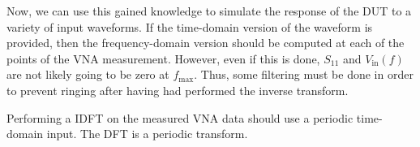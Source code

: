 \documentclass{article}
\begin{document}
Now, we can use this gained knowledge to simulate the response of the DUT to a
variety of input waveforms. If the time-domain version of the waveform is
provided, then the frequency-domain version should be computed at each of the
points of the VNA measurement. However, even if this is done, $ S_{11} $ and $
V_{\text{in}}(f) $ are not likely going to be zero at $ f_{\text{max}} $. Thus,
some filtering must be done in order to prevent ringing after having had
performed the inverse transform.

\begin{framed}
   Performing a IDFT on the measured VNA data should use a periodic time-domain
   input. The DFT is a periodic transform.
\end{framed}
\end{document}
